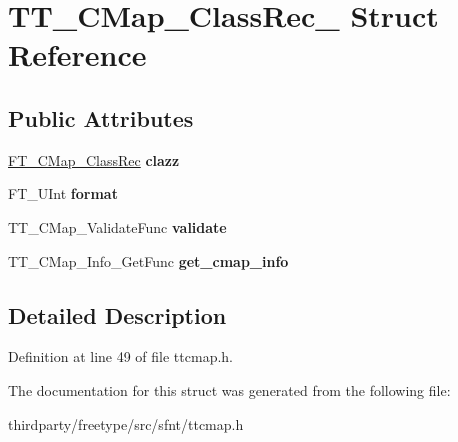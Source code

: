 \hypertarget{struct_t_t___c_map___class_rec__}{}\section{T\+T\+\_\+\+C\+Map\+\_\+\+Class\+Rec\+\_\+ Struct Reference}
\label{struct_t_t___c_map___class_rec__}
\subsection*{Public Attributes}
\begin{DoxyCompactItemize}
\item 
\mbox{\label{struct_t_t___c_map___class_rec___a69bc97d83ae930277add2222f7822c87}} 
\hyperlink{struct_f_t___c_map___class_rec__}{F\+T\+\_\+\+C\+Map\+\_\+\+Class\+Rec} {\bfseries clazz}
\item 
\mbox{\label{struct_t_t___c_map___class_rec___a1b45f969acb709e742b4c8087a5689eb}} 
F\+T\+\_\+\+U\+Int {\bfseries format}
\item 
\mbox{\label{struct_t_t___c_map___class_rec___a2bd8e80cd19a515febf91e1fa5ad7263}} 
T\+T\+\_\+\+C\+Map\+\_\+\+Validate\+Func {\bfseries validate}
\item 
\mbox{\label{struct_t_t___c_map___class_rec___ae11e3d3bc326ec65521b9e57c8dd7c0f}} 
T\+T\+\_\+\+C\+Map\+\_\+\+Info\+\_\+\+Get\+Func {\bfseries get\+\_\+cmap\+\_\+info}
\end{DoxyCompactItemize}


\subsection{Detailed Description}


Definition at line 49 of file ttcmap.\+h.



The documentation for this struct was generated from the following file\+:\begin{DoxyCompactItemize}
\item 
thirdparty/freetype/src/sfnt/ttcmap.\+h\end{DoxyCompactItemize}
